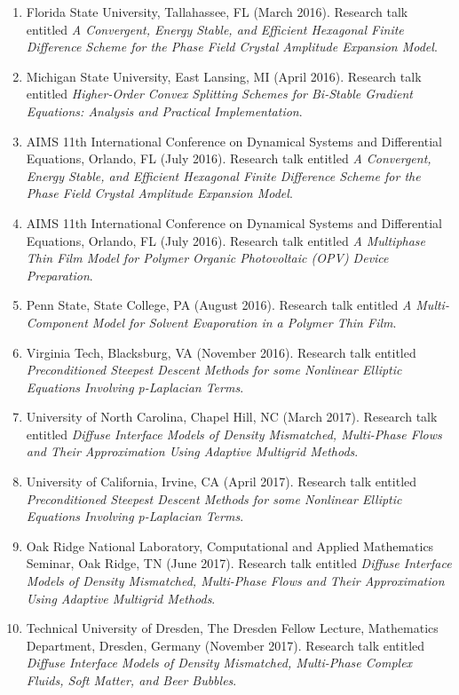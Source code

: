 \documentclass[11pt]{letter}
\begin{document}
\begin{enumerate}
	\item
Florida State University, Tallahassee, FL (March 2016). Research talk entitled {\sl A Convergent, Energy Stable, and Efficient Hexagonal Finite Difference Scheme for the Phase Field Crystal Amplitude Expansion Model}.
	\item
Michigan State University, East Lansing, MI (April 2016). Research talk entitled {\sl Higher-Order Convex Splitting Schemes for Bi-Stable Gradient Equations: Analysis and Practical Implementation}.
	\item
AIMS 11th International Conference on Dynamical Systems and Differential Equations, Orlando, FL (July 2016). Research talk entitled {\sl A Convergent, Energy Stable, and Efficient Hexagonal Finite Difference Scheme for the Phase Field Crystal Amplitude Expansion Model}.
	\item
AIMS 11th International Conference on Dynamical Systems and Differential Equations, Orlando, FL (July 2016). Research talk entitled {\sl A Multiphase Thin Film Model for Polymer Organic Photovoltaic (OPV) Device Preparation}.
	\item
Penn State, State College, PA (August 2016).  Research talk entitled {\sl A Multi-Component Model for Solvent Evaporation in a Polymer Thin Film}.
	\item
Virginia Tech, Blacksburg, VA (November 2016).  Research talk entitled {\sl Preconditioned Steepest Descent Methods for some Nonlinear Elliptic Equations Involving p-Laplacian Terms}.
	\item
University of North Carolina, Chapel Hill, NC (March 2017).  Research talk entitled {\sl Diffuse Interface Models of Density Mismatched, Multi-Phase Flows and Their Approximation Using Adaptive Multigrid Methods}.
	\item
University of California, Irvine, CA (April 2017).  Research talk entitled {\sl Preconditioned Steepest Descent Methods for some Nonlinear Elliptic Equations Involving p-Laplacian Terms}.
	\item
Oak Ridge National Laboratory, Computational and Applied Mathematics Seminar, Oak Ridge, TN (June 2017).  Research talk entitled {\sl Diffuse Interface Models of Density Mismatched, Multi-Phase Flows and Their Approximation Using Adaptive Multigrid Methods}.
	\item
Technical University of Dresden, The Dresden Fellow Lecture, Mathematics Department, Dresden, Germany (November 2017).  Research talk entitled {\sl Diffuse Interface Models of Density Mismatched, Multi-Phase Complex Fluids, Soft Matter, and Beer Bubbles}.

\end{enumerate}
\end{document}
